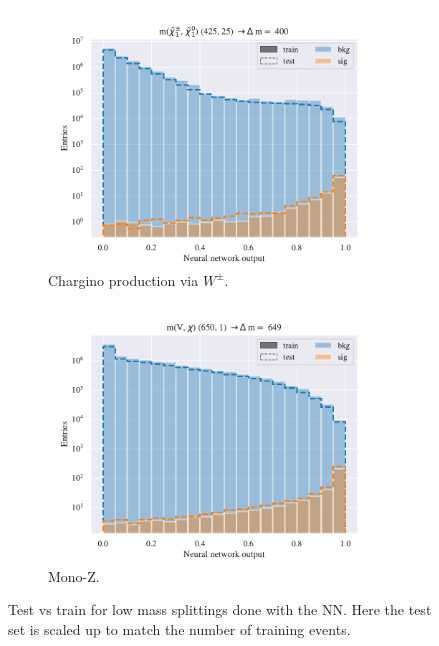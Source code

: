 \begin{figure}[H]
    \begin{subfigure}[t!]{0.49\textwidth}
        \includegraphics[width = \textwidth]{Figures/WW/NN/High_level/High/scaled_train_test_395330.pdf}
        \caption{Chargino production via $W^\pm$.}
        \label{fig:WWNNLow}
    \end{subfigure}
    \begin{subfigure}[t!]{0.49\textwidth}
        \includegraphics[width = \textwidth]{Figures/Mono_Z/ML/NN/High_level/High/scaled_train_test_310617.pdf}
        \caption{Mono-Z.}
        \label{fig:MonoZNNLow}
    \end{subfigure}
    \caption{Test vs train for low mass splittings done with the NN. Here the test set is scaled up to match the number of training events.}
    \label{fig:AllLowNN}
\end{figure}


